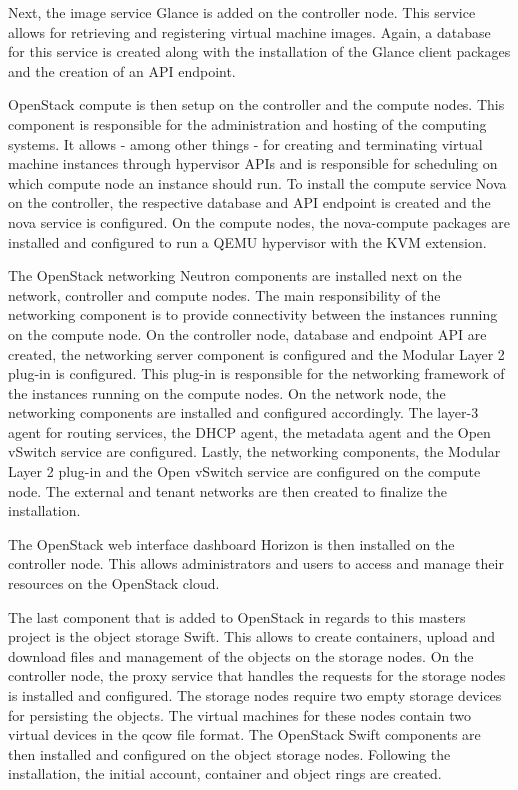 Next, the image service Glance is added on the controller node. This service allows for retrieving and registering virtual machine images. Again, a database for this service is created along with the installation of the Glance client packages and the creation of an API endpoint.

OpenStack compute is then setup on the controller and the compute nodes. This component is responsible for the administration and hosting of the computing systems. It allows - among other things - for creating and terminating virtual machine instances through hypervisor APIs and is responsible for scheduling on which compute node an instance should run. To install the compute service Nova on the controller, the respective database and API endpoint is created and the nova service is configured. On the compute nodes, the nova-compute packages are installed and configured to run a QEMU hypervisor with the KVM extension.

The OpenStack networking Neutron components are installed next on the network, controller and compute nodes. The main responsibility of the networking component is to provide connectivity between the instances running on the compute node. On the controller node, database and endpoint API are created, the networking server component is configured and the Modular Layer 2 plug-in is configured. This plug-in is responsible for the networking framework of the instances running on the compute nodes. On the network node, the networking components are installed and configured accordingly. The layer-3 agent for routing services, the DHCP agent, the metadata agent and the Open vSwitch service are configured. Lastly, the networking components, the Modular Layer 2 plug-in and the Open vSwitch service are configured on the compute node. The external and tenant networks are then created to finalize the installation.

The OpenStack web interface dashboard Horizon is then installed on the controller node. This allows administrators and users to access and manage their resources on the OpenStack cloud.

The last component that is added to OpenStack in regards to this masters project is the object storage Swift. This allows to create containers, upload and download files and management of the objects on the storage nodes. On the controller node, the proxy service that handles the requests for the storage nodes is installed and configured. The storage nodes require two empty storage devices for persisting the objects. The virtual machines for these nodes contain two virtual devices in the qcow file format. The OpenStack Swift components are then installed and configured on the object storage nodes. Following the installation, the initial account, container and object rings are created.


